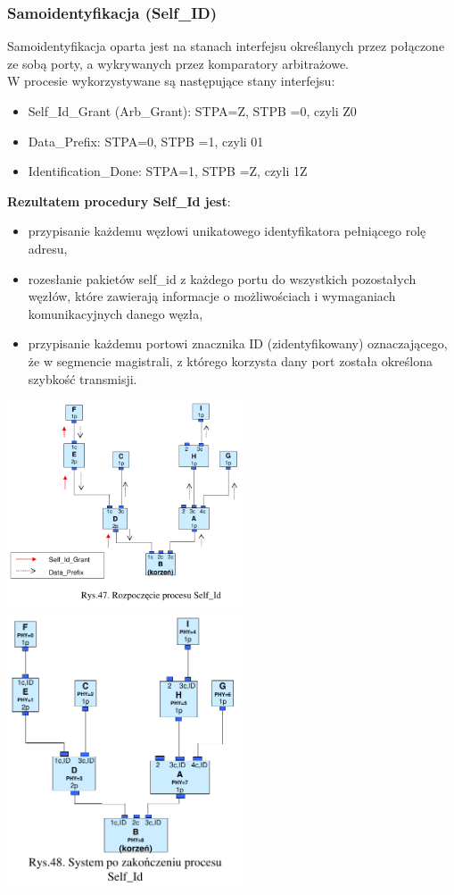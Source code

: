 \subsubsection{Samoidentyfikacja (Self\_ID)}
Samoidentyfikacja oparta jest na stanach interfejsu określanych przez połączone ze sobą porty, a wykrywanych przez komparatory arbitrażowe.\\
W procesie wykorzystywane są następujące stany interfejsu:
\begin{itemize}
	\item Self\_Id\_Grant (Arb\_Grant): STPA=Z, STPB =0, czyli Z0
	\item Data\_Prefix: STPA=0, STPB =1, czyli 01
	\item Identification\_Done: STPA=1, STPB =Z, czyli 1Z
\end{itemize}
\textbf{Rezultatem procedury Self\_Id jest}:
\begin{itemize}
	\item przypisanie każdemu węzłowi unikatowego identyfikatora pełniącego rolę adresu,
	\item rozesłanie pakietów self\_id z każdego portu do wszystkich pozostałych węzłów,
	które zawierają informacje o możliwościach i wymaganiach komunikacyjnych
	danego węzła,
	\item przypisanie każdemu portowi znacznika ID (zidentyfikowany) oznaczającego,
	że w segmencie magistrali, z którego korzysta dany port została określona
	szybkość transmisji.
\end{itemize}
\includegraphics[width=7cm]{./wyklady/FIREWIRE_62_1.pdf}
\includegraphics[width=7cm]{./wyklady/FIREWIRE_63_1.pdf}

